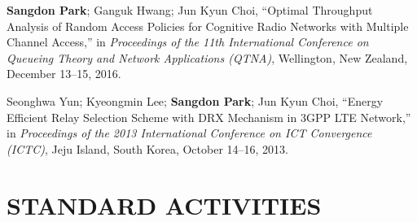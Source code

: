 \documentclass[11pt,a4paper]{article}
\begin{document}
\begin{enumerate}[label={[{\arabic*}]}, leftmargin=*, itemsep=0.3em]
\item \textbf{Sangdon Park}; Ganguk Hwang; Jun Kyun Choi, ``Optimal Throughput Analysis of Random Access Policies for Cognitive Radio Networks with Multiple Channel Access,'' in \textit{Proceedings of the 11th International Conference on Queueing Theory and Network Applications (QTNA)}, Wellington, New Zealand, December 13--15, 2016.

\item Seonghwa Yun; Kyeongmin Lee; \textbf{Sangdon Park}; Jun Kyun Choi, ``Energy Efficient Relay Selection Scheme with DRX Mechanism in 3GPP LTE Network,'' in \textit{Proceedings of the 2013 International Conference on ICT Convergence (ICTC)}, Jeju Island, South Korea, October 14--16, 2013.
\end{enumerate}

\section{STANDARD ACTIVITIES}
\end{document}

